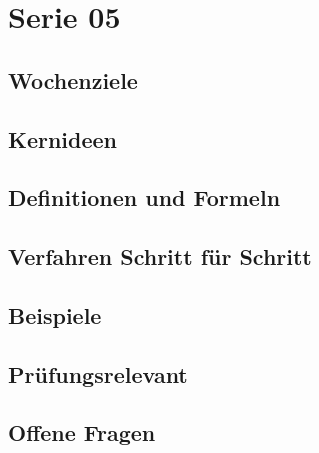 \chapter{Serie 05}
\label{kap:serie05}

\section*{Wochenziele}
\begin{wochenziele}
\end{wochenziele}

\section{Kernideen}

\section{Definitionen und Formeln}

\section{Verfahren Schritt für Schritt}

\section{Beispiele}

\section{Prüfungsrelevant}

\section{Offene Fragen}
